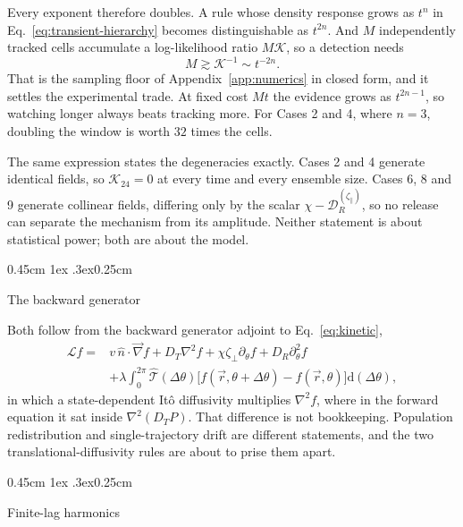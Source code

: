 \documentclass[
  reprint,
  superscriptaddress,
  amsmath,
  amssymb,
  aps,
  pre,
  nofootinbib,
  floatfix
]{revtex4-2}
\makeatletter
\newcommand{\rv}{\vec r}
\newcommand{\ev}{\hat{n}}
\newcommand{\grad}{\vec{\nabla}}
\newcommand{\lap}{\nabla^2}
\newcommand{\dd}{\mathrm d}
\newcommand{\zp}{\zeta_\parallel}
\def\subsection{\@startsection{subsection}{2}{\z@}%
  {0.45cm \@plus1ex \@minus.3ex}{0.25cm}%
  {\normalfont\small\bfseries\raggedright}}%
\makeatother
\begin{document}
Every exponent therefore doubles.  A rule whose density response grows as
$t^{n}$ in Eq.~\eqref{eq:transient-hierarchy} becomes distinguishable as
$t^{2n}$.  And $M$ independently tracked cells accumulate a log-likelihood
ratio $M\mathcal K$, so a detection needs
\begin{equation}
 M\gtrsim\mathcal K^{-1}\sim t^{-2n}.
 \label{eq:sample-size}
\end{equation}
That is the sampling floor of Appendix~\ref{app:numerics} in closed form,
and it settles the experimental trade.  At fixed cost $Mt$ the evidence grows
as $t^{2n-1}$, so watching longer always beats tracking more.  For Cases 2 and
4, where $n=3$, doubling the window is worth $32$ times the cells.

The same expression states the degeneracies exactly.  Cases 2 and 4 generate
identical fields, so $\mathcal K_{24}=0$ at every time and every ensemble
size.  Cases 6, 8 and 9 generate collinear fields, differing only by the
scalar $\chi-\mathcal D_R^{(\zp)}$, so no release can separate the mechanism
from its amplitude.  Neither statement is about statistical power; both are
about the model.

\subsection{The backward generator}

Both follow from the backward generator adjoint to
Eq.~\eqref{eq:kinetic},
\begin{align}
 \mathcal Lf={}&v\,\ev\cdot\grad f+D_T\lap f
 +\chi\zeta_\perp\partial_\theta f+D_R\partial_\theta^2f
 \nonumber\\
 &+\lambda\!\int_0^{2\pi}\!\!\widehat{\mathcal T}(\Delta\theta)
 \bigl[f(\rv,\theta+\Delta\theta)-f(\rv,\theta)\bigr]\dd(\Delta\theta),
 \label{eq:backward-generator}
\end{align}
in which a state-dependent It\^o diffusivity multiplies $\lap f$, where in
the forward equation it sat inside $\lap(D_TP)$.  That difference is not
bookkeeping.  Population redistribution and single-trajectory drift are
different statements, and the two translational-diffusivity rules are about to
prise them apart.

\subsection{Finite-lag harmonics}
\end{document}
